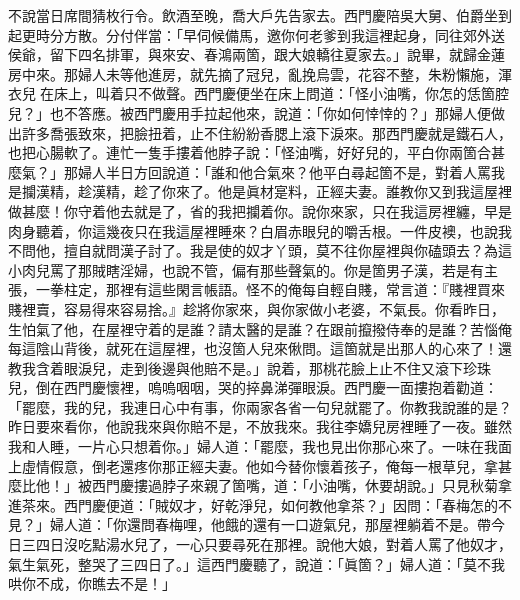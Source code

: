不說當日席間猜枚行令。飲酒至晚，喬大戶先告家去。西門慶陪吳大舅、伯爵坐到起更時分方散。分付伴當：「早伺候備馬，邀你何老爹到我這裡起身，同往郊外送侯爺，留下四名排軍，與來安、春鴻兩箇，跟大娘轎往夏家去。」說畢，就歸金蓮房中來。那婦人未等他進房，就先摘了冠兒，亂挽烏雲，花容不整，朱粉懶施，渾衣兒𢱉在床上，叫着只不做聲。西門慶便坐在床上問道：「怪小油嘴，你怎的恁箇腔兒？」也不答應。被西門慶用手拉起他來，說道：「你如何悻悻的？」那婦人便做出許多喬張致來，把臉扭着，止不住紛紛香腮上滾下淚來。那西門慶就是鐵石人，也把心腸軟了。{}連忙一隻手摟着他脖子說：「怪油嘴，好好兒的，平白你兩箇合甚麼氣？」那婦人半日方回說道：「誰和他合氣來？他平白尋起箇不是，對着人罵我是攔漢精，趁漢精，{}趁了你來了。他是眞材寔料，正經夫妻。誰教你又到我這屋裡做甚麼！你守着他去就是了，省的我把攔着你。說你來家，只在我這房裡纏，早是肉身聽着，你這幾夜只在我這屋裡睡來？白眉赤眼兒的嚼舌根。一件皮襖，也說我不問他，擅自就問漢子討了。我是使的奴才丫頭，莫不往你屋裡與你磕頭去？為這小肉兒罵了那賊瞎淫婦，也說不管，偏有那些聲氣的。你是箇男子漢，若是有主張，一拳柱定，那裡有這些閑言帳語。怪不的俺每自輕自賤，常言道：『賤裡買來賤裡賣，容易得來容易捨。』趁將你家來，與你家做小老婆，不氣長。你看昨日，生怕氣了他，在屋裡守着的是誰？請太醫的是誰？在跟前攛撥侍奉的是誰？苦惱俺每這陰山背後，就死在這屋裡，也沒箇人兒來偢問。這箇就是出那人的心來了！還教我含着眼淚兒，走到後邊與他賠不是。」{}說着，那桃花臉上止不住又滾下珍珠兒，倒在西門慶懷裡，嗚嗚咽咽，哭的捽鼻涕彈眼淚。西門慶一面摟抱着勸道：「罷麼，我的兒，我連日心中有事，你兩家各省一句兒就罷了。你教我說誰的是？{}昨日要來看你，他說我來與你賠不是，不放我來。我往李嬌兒房裡睡了一夜。雖然我和人睡，一片心只想着你。」婦人道：「罷麼，我也見出你那心來了。一味在我面上虛情假意，倒老還疼你那正經夫妻。他如今替你懷着孩子，俺每一根草兒，拿甚麼比他！」被西門慶摟過脖子來親了箇嘴，道：「小油嘴，休要胡說。」只見秋菊拿進茶來。西門慶便道：「賊奴才，好乾淨兒，如何教他拿茶？」因問：「春梅怎的不見？」婦人道：「你還問春梅哩，他餓的還有一口遊氣兒，那屋裡躺着不是。帶今日三四日沒吃點湯水兒了，一心只要尋死在那裡。說他大娘，對着人罵了他奴才，氣生氣死，整哭了三四日了。」這西門慶聽了，說道：「眞箇？」婦人道：「莫不我哄你不成，你瞧去不是！」

